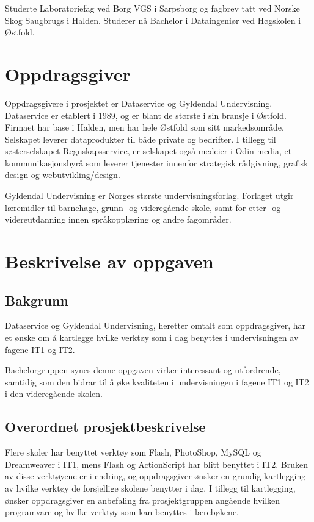 \documentclass[norsk,a4paper,12pt]{article}
\begin{document}
Studerte Laboratoriefag ved Borg VGS i Sarpsborg og fagbrev tatt ved Norske Skog Saugbrugs i Halden. Studerer nå Bachelor i Dataingeniør ved Høgskolen i Østfold.


\section{Oppdragsgiver}

Oppdragsgivere i prosjektet er Dataservice og Gyldendal Undervisning. Dataservice er etablert i 1989, og er blant de største i sin bransje i Østfold. Firmaet har base i Halden, men har hele Østfold som sitt markedsområde. Selskapet leverer dataprodukter til både private og bedrifter. I tillegg til søsterselskapet Regnskapsservice, er selskapet også medeier i Odin media, et kommunikasjonsbyrå som leverer tjenester innenfor strategisk rådgivning, grafisk design og webutvikling/design.\newline

Gyldendal Undervisning er Norges største undervisningsforlag. Forlaget utgir læremidler til barnehage, grunn- og videregående skole, samt for etter- og videreutdanning innen språkopplæring og andre fagområder.

\newpage

\section{Beskrivelse av oppgaven}

\subsection{Bakgrunn}

Dataservice og Gyldendal Undervisning, heretter omtalt som oppdragsgiver,  har et ønske om å kartlegge hvilke verktøy som i dag benyttes i undervisningen av fagene IT1 og IT2. 

Bachelorgruppen synes denne oppgaven virker interessant og utfordrende, samtidig som den bidrar til å øke kvaliteten i undervisningen i fagene IT1 og IT2 i den videregående skolen. 

\subsection{Overordnet prosjektbeskrivelse}

 

Flere skoler har benyttet verktøy som Flash, PhotoShop, MySQL og Dreamweaver i IT1, mens Flash og ActionScript har blitt benyttet i IT2. 
Bruken av disse verktøyene er i endring, og oppdragsgiver ønsker en grundig kartlegging av hvilke verktøy de forsjellige skolene benytter i dag. I tillegg til kartlegging,  ønsker oppdragsgiver en anbefaling fra prosjektgruppen angående hvilken programvare og hvilke verktøy som kan benyttes i lærebøkene. 
\end{document}
